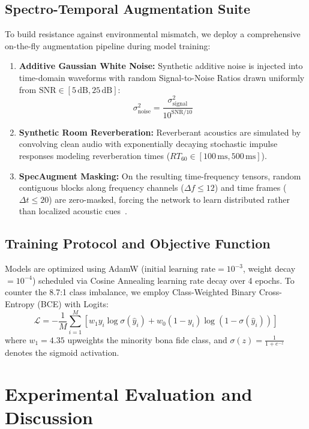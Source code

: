 \documentclass[runningheads]{llncs}
\begin{document}
\subsection{Spectro-Temporal Augmentation Suite}
To build resistance against environmental mismatch, we deploy a comprehensive on-the-fly augmentation pipeline during model training:
\begin{enumerate}
    \item \textbf{Additive Gaussian White Noise:} Synthetic additive noise is injected into time-domain waveforms with random Signal-to-Noise Ratios drawn uniformly from $\text{SNR} \in [5\,\text{dB}, 25\,\text{dB}]$:
    \begin{equation}
    \sigma_{\text{noise}}^2 = \frac{\sigma_{\text{signal}}^2}{10^{\text{SNR}/10}}
    \end{equation}
    \item \textbf{Synthetic Room Reverberation:} Reverberant acoustics are simulated by convolving clean audio with exponentially decaying stochastic impulse responses modeling reverberation times ($RT_{60} \in [100\,\text{ms}, 500\,\text{ms}]$).
    \item \textbf{SpecAugment Masking:} On the resulting time-frequency tensors, random contiguous blocks along frequency channels ($\Delta f \le 12$) and time frames ($\Delta t \le 20$) are zero-masked, forcing the network to learn distributed rather than localized acoustic cues~\cite{park2019specaugment}.
\end{enumerate}

\subsection{Training Protocol and Objective Function}
Models are optimized using AdamW ($\text{initial learning rate} = 10^{-3}$, weight decay $= 10^{-4}$) scheduled via Cosine Annealing learning rate decay over 4 epochs. To counter the 8.7:1 class imbalance, we employ Class-Weighted Binary Cross-Entropy (BCE) with Logits:
\begin{equation}
\mathcal{L} = -\frac{1}{M}\sum_{i=1}^{M} \left[ w_1 y_i \log \sigma(\hat{y}_i) + w_0 (1 - y_i) \log(1 - \sigma(\hat{y}_i)) \right]
\label{eq:weighted_loss}
\end{equation}
where $w_1 = 4.35$ upweights the minority bona fide class, and $\sigma(z) = \frac{1}{1 + e^{-z}}$ denotes the sigmoid activation.

\section{Experimental Evaluation and Discussion}
\label{sec:results}
\end{document}

